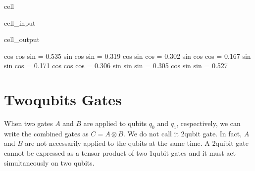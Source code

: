 \documentclass[letterpaper,10pt,english]{jupyterBook}
\begin{document}
\begin{sphinxuseclass}{cell}
\begin{sphinxVerbatimInput}
\begin{sphinxuseclass}{cell_input}
\begin{sphinxVerbatim}[commandchars=\\\{\}]
  

  

   
      \PYG{p}{[}\PYG{p}{]}
\end{sphinxVerbatim}

\end{sphinxuseclass}\end{sphinxVerbatimInput}
\begin{sphinxVerbatimOutput}

\begin{sphinxuseclass}{cell_output}
\begin{sphinxVerbatim}[commandchars=\\\{\}]
 cos cos sin  = 0.535
 sin cos sin  = 0.319
 cos sin cos  = 0.302
 sin cos cos  = 0.167
 sin sin cos  = 0.171
 cos cos cos  = 0.306
 sin sin sin  = 0.305
 cos sin sin  = 0.527
\end{sphinxVerbatim}

\end{sphinxuseclass}\end{sphinxVerbatimOutput}

\end{sphinxuseclass}
\sphinxstepscope


\chapter{Two\sphinxhyphen{}qubits Gates}
\label{\detokenize{q2gates/intro:two-qubits-gates}}\label{\detokenize{q2gates/intro::doc}}
\sphinxAtStartPar
When two gates \(A\) and \(B\) are applied to qubits \(q_0\) and \(q_1\), respectively, we can write the combined gates as \(C = A \otimes B\). We do not call it 2\sphinxhyphen{}qubit gate. In fact, \(A\) and \(B\) are not necessarily applied to the qubits at the same time.   A 2\sphinxhyphen{}quibit gate  cannot be expressed as a tensor product of two 1\sphinxhyphen{}qubit gates and it must act simultaneously on two qubits.
\end{document}
